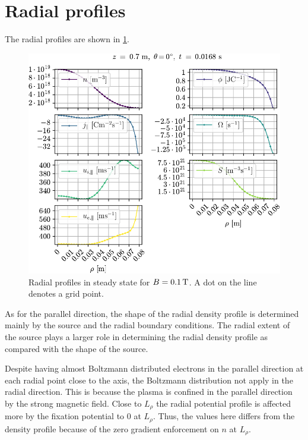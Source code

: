 \section{Radial profiles}
%
The radial profiles are shown in \cref{fig:radProfs}.
%
\begin{figure}[htb]
    \centering
    \includegraphics{fig/results/1DProfiles/B010Rad}
    \caption{Radial profiles in steady state for $B=0.1\, \text{T}$.
        A dot on the line denotes a grid point.
    }
    \label{fig:radProfs}
\end{figure}
%
As for the parallel direction, the shape of the radial density profile is determined mainly by the source and the radial boundary conditions.
The radial extent of the source plays a larger role in determining the radial density profile as compared with the shape of the source.

Despite having almost Boltzmann distributed electrons in the parallel direction at each radial point close to the axis, the Boltzmann distribution not apply in the radial direction.
This is because the plasma is confined in the parallel direction by the strong magnetic field.
Close to $L_\rho$ the radial potential profile is affected more by the fixation potential to $0$ at $L_\rho$.
Thus, the values here differs from the density profile because of the zero gradient enforcement on $n$ at $L_\rho$.
